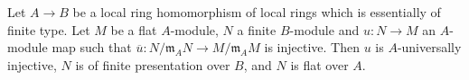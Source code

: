 %

\begin{proposition}
\label{proposition-finite-type-injective-into-flat-mod-m}
Let $A \to B$ be a local ring homomorphism of local rings
which is essentially of finite type. Let $M$ be a flat $A$-module,
$N$ a finite $B$-module and $u : N \to M$ an $A$-module map such that
$\overline{u} : N/\mathfrak m_AN \to M/\mathfrak m_AM$ is injective.
Then $u$ is $A$-universally injective, $N$ is of finite presentation over
$B$, and $N$ is flat over $A$.
\end{proposition}

